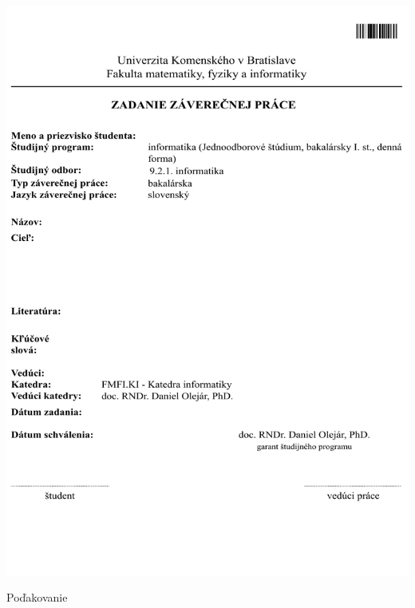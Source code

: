 \documentclass[12pt, oneside]{book}
\begin{document}
\newpage 
\thispagestyle{empty}
\hspace{-3cm}\includegraphics[width=1.4\textwidth]{images/zadanie.pdf}


\frontmatter

\newpage 
\thispagestyle{empty}

\vfill
\huge{Poďakovanie}
\normalsize
\newline
{}
\end{document}
